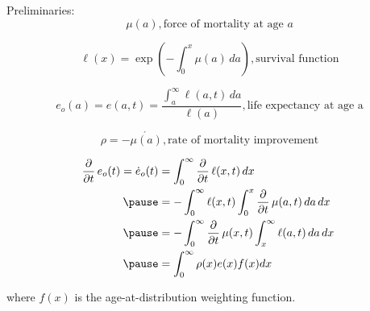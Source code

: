 \documentclass[xcolor={dvipsnames}]{beamer}
\begin{document}
\begin{frame}
\Large{
Preliminaries:
\begin{equation*}
\mu(a), \text{force of mortality at age } a
\end{equation*}

\begin{equation*}
\ell(x) = \exp(-\int_0^x \mu(a)\, da), \text{survival function}
\end{equation*}

\begin{equation*}
e_o(a)=e(a,t)=\frac{\int_a^\infty\ell (a,t)\, da}{\ell (a)}, \text{life expectancy at age a}
\end{equation*}

\begin{equation*}
\rho = -\acute{\mu(a)}, \text{rate of mortality improvement}
\end{equation*}

}
\end{frame}


\begin{frame}
\Large{
\[
  \begin{aligned}
    \frac{\partial}{\partial t}\,e_o(t)=\dot{e}_o(t)	& = \int_0 ^\infty\frac{\partial}{\partial t}\,\ell(x,t)\,dx \\ \pause
    &=-\int_0^\infty\ell(x,t)\int_0^x\frac{\partial}{\partial t}\,\mu(a,t)\,da\,dx	\\ \pause
							& =-\int_0^\infty\frac{\partial}{\partial t}\,\mu(x,t)\int_x^\infty\ell(a,t)\,da\,dx\; \\ \pause
							&=\int_0^\infty \rho(x)e(x)f(x)dx
  \end{aligned}
\]

where $f(x)$ is the age-at-distribution weighting function.
}
\end{frame}
\end{document}
